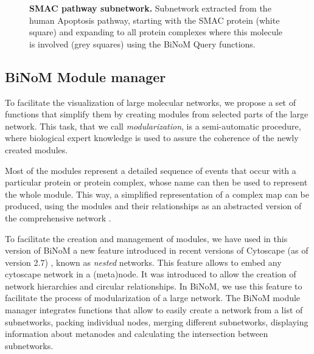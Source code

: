 \documentclass[10pt]{bmc_article}
\newenvironment{bmcformat}{\baselineskip20pt\sloppy\setboolean{publ}{false}}{\baselineskip20pt\sloppy}
\begin{document}
\begin{bmcformat}
\begin{figure}[h]
 \caption{\label{smaccomplexes}  \textbf{SMAC pathway subnetwork.}
      Subnetwork extracted from the human Apoptosis pathway, starting with the
SMAC protein (white square) and expanding to all protein complexes where this
molecule is involved (grey squares) using the BiNoM Query functions.}
\end{figure}

\subsection*{BiNoM Module manager}

To facilitate the visualization of large molecular networks, we propose a set of
functions that simplify them by creating modules from selected parts of the
large network. This task, that we call \emph{modularization}, is a
semi-automatic procedure, where biological expert knowledge is used to assure
the coherence of the newly created modules. 

Most of the modules represent a detailed
sequence of events that occur with a particular protein or protein complex,
whose name can then be used to represent the whole module. This way, a
simplified representation of a complex map can be produced, using the modules
and their relationships as an abstracted version of the comprehensive network
\cite{calzone2008comprehensive}.

To facilitate the creation and management of modules, we have used in this
version of BiNoM a new feature introduced in recent versions of Cytoscape (as of
version 2.7) \cite{cline2007integration}, known as \emph{nested} networks. This
feature allows to embed any cytoscape network in a (meta)node. It was
introduced to allow the creation of network hierarchies and circular
relationships. In BiNoM, we use this feature to facilitate the process of
modularization of a large network. The BiNoM module manager integrates 
functions that allow to easily create a network from a list of subnetworks,
packing individual nodes, merging different subnetworks, displaying information
about metanodes and calculating the intersection between subnetworks.


\end{bmcformat}
\end{document}
